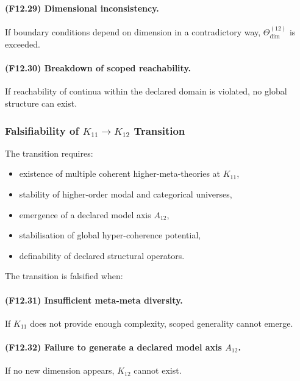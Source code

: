 \paragraph{(F12.29) Dimensional inconsistency.}
If boundary conditions depend on dimension in a contradictory way,
$\Theta_{\mathrm{dim}}^{(12)}$ is exceeded.

\paragraph{(F12.30) Breakdown of scoped reachability.}
If reachability of continua within the declared domain is violated,
no global structure can exist.



\subsubsection{Falsifiability of $K_{11} \to K_{12}$ Transition}

The transition requires:

\begin{itemize}
    \item existence of multiple coherent higher-meta-theories at $K_{11}$,
    \item stability of higher-order modal and categorical universes,
    \item emergence of a declared model axis $A_{12}$,
    \item stabilisation of global hyper-coherence potential,
    \item definability of declared structural operators.
\end{itemize}

The transition is falsified when:

\paragraph{(F12.31) Insufficient meta-meta diversity.}
If $K_{11}$ does not provide enough complexity, scoped generality cannot emerge.

\paragraph{(F12.32) Failure to generate a declared model axis $A_{12}$.}
If no new dimension appears, $K_{12}$ cannot exist.

